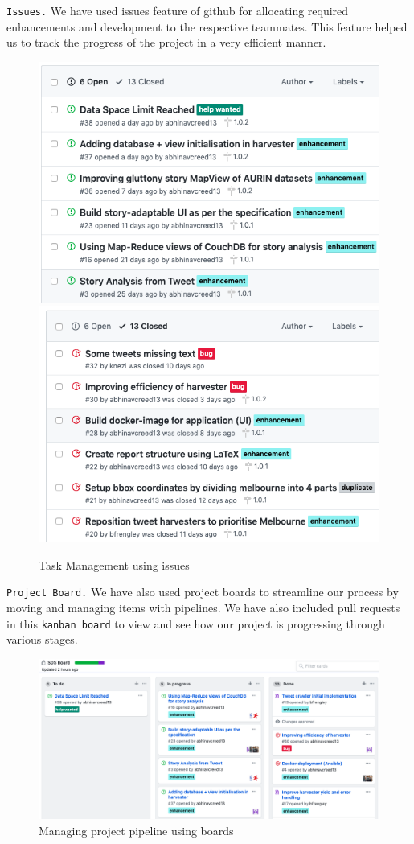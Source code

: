 \texttt{Issues.} We have used issues feature of github for allocating required enhancements and development to the respective teammates. This feature helped us to track the progress of the project in a very efficient manner.

\begin{figure}[H]
  \centering%
    \includegraphics[width=.45\linewidth]{images/git/open_issues.png}\hfill%
    \includegraphics[width=.45\linewidth]{images/git/closed_issues.png}%
    \caption{Task Management using issues}
\end{figure}

\texttt{Project Board.} We have also used project boards to streamline our process by moving and managing items with pipelines. We have also included pull requests in this \texttt{kanban board} to view and see how our project is progressing through various stages.

\begin{figure}[H]
    \centering
    \includegraphics[width=15cm,keepaspectratio=true]{images/git/board_github.png}
    \caption{Managing project pipeline using boards}
\end{figure}

